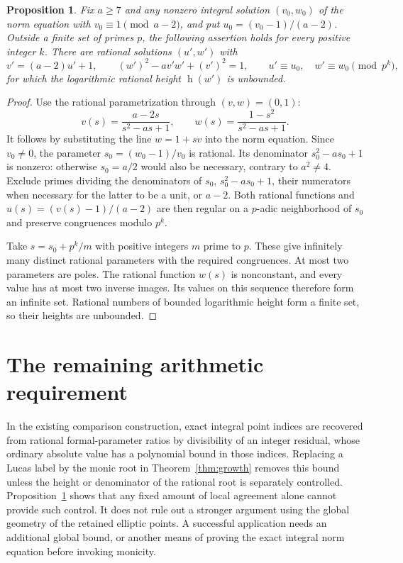 \documentclass[11pt]{article}
\newtheorem{proposition}[theorem]{Proposition}
\newcommand{\hgt}{\operatorname{h}}
\begin{document}
\begin{proposition}\label{prop:approximation}
Fix $a\ge7$ and any nonzero integral solution $(v_0,w_0)$ of the
norm equation with $v_0\equiv1\pmod{a-2}$, and put
$u_0=(v_0-1)/(a-2)$. Outside a finite set of primes $p$, the
following assertion holds for every positive integer $k$.
There are rational solutions $(u',w')$ with
\[
 v'=(a-2)u'+1,\qquad (w')^2-av'w'+(v')^2=1,
 \qquad u'\equiv u_0,\quad w'\equiv w_0\pmod{p^k},
\]
for which the logarithmic rational height $\hgt(w')$ is unbounded.
\end{proposition}
\begin{proof}
Use the rational parametrization through $(v,w)=(0,1)$:
\[
 v(s)=\frac{a-2s}{s^2-as+1},\qquad
 w(s)=\frac{1-s^2}{s^2-as+1}.
\]
It follows by substituting the line $w=1+sv$ into the norm
equation. Since $v_0\ne0$, the parameter
$s_0=(w_0-1)/v_0$ is rational. Its denominator
$s_0^2-as_0+1$ is nonzero: otherwise $s_0=a/2$ would also be
necessary, contrary to $a^2\ne4$.
Exclude primes dividing the denominators of $s_0$,
$s_0^2-as_0+1$, their numerators when necessary for the latter
to be a unit, or $a-2$. Both rational functions and
$u(s)=(v(s)-1)/(a-2)$ are then regular on a $p$-adic
neighborhood of $s_0$ and preserve congruences modulo $p^k$.

Take $s=s_0+p^k/m$ with positive integers $m$ prime to $p$.
These give infinitely many distinct rational parameters with the
required congruences. At most two parameters are poles. The
rational function $w(s)$ is nonconstant, and every value has at
most two inverse images. Its values on this sequence therefore
form an infinite set. Rational numbers of bounded logarithmic
height form a finite set, so their heights are unbounded.
\end{proof}

\section*{The remaining arithmetic requirement}
In the existing comparison construction, exact integral point
indices are recovered from rational formal-parameter ratios by
divisibility of an integer residual, whose ordinary absolute value
has a polynomial bound in those indices. Replacing a Lucas label
by the monic root in Theorem~\ref{thm:growth} removes this bound
unless the height or denominator of the rational root is separately
controlled. Proposition~\ref{prop:approximation} shows that any
fixed amount of local agreement alone cannot provide such control.
It does not rule out a stronger argument using the global geometry
of the retained elliptic points. A successful application needs an
additional global bound, or another means of proving the exact
integral norm equation before invoking monicity.
\end{document}
